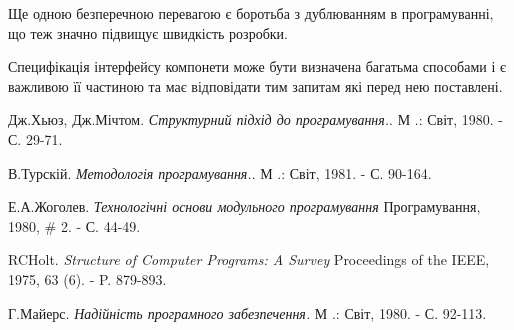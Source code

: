 \documentclass[a4paper,14pt, titlepage]{article}
\begin{document}
Ще одною безперечною перевагою є боротьба з дублюванням в програмуванні,
що теж значно підвищує швидкість розробки.

Специфікація інтерфейсу компонети може бути визначена багатьма способами і є важливою її частиною та має відповідати
тим запитам які перед нею поставлені.

\begin{thebibliography}{9}
    Дж.Хьюз, Дж.Мічтом.
    \textit{Структурний підхід до програмування.}.
    М .: Світ, 1980. - С. 29-71.

    В.Турскій.
    \textit{Методологія програмування.}.
    М .: Світ, 1981. - С. 90-164.

    Е.А.Жоголев.
    \textit{Технологічні основи модульного програмування}
    Програмування, 1980, # 2. - С. 44-49.

    RCHolt.
    \textit{Structure of Computer Programs: A Survey}
    Proceedings of the IEEE, 1975, 63 (6). - P. 879-893.

    Г.Майерс.
    \textit{Надійність програмного забезпечення.}
    М .: Світ, 1980. - С. 92-113.
\end{thebibliography}
\end{document}
